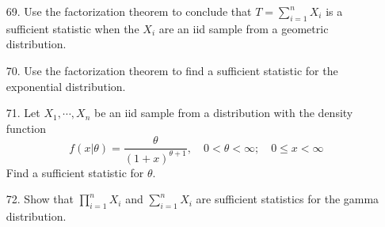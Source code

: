 \documentclass{article}
\begin{document}
\begin{itemize}
\begin{enumerate}[a.]
		\end{enumerate}

	\item[69.] Use the factorization theorem to conclude that $\displaystyle T=\sum_{i=1}^{n} X_i$ is a sufficient statistic when the $X_i$ are an iid sample from a geometric distribution.

	\item[70.] Use the factorization theorem to find a sufficient statistic for the exponential distribution.

	\item[71.] Let $X_1, \cdots, X_n$ be an iid sample from a distribution with the density function \[f(x|\theta)=\frac{\theta}{(1+x)^{\theta+1}}, \quad 0<\theta<\infty; \quad 0\le x<\infty\] Find a sufficient statistic for $\theta.$

	\item[72.] Show that $\displaystyle \prod_{i=1}^n X_i$ and $\displaystyle\sum_{i=1}^{n} X_i$ are sufficient statistics for the gamma distribution.

\end{itemize}
\end{document}
